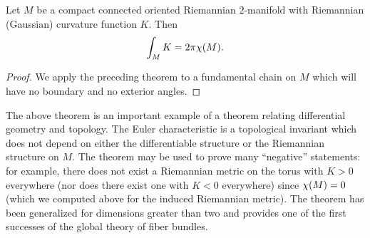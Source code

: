 \documentclass[../main]{subfiles}
\begin{document}
\begin{theorem} \label{thm:ch8.1.5}
Let $M$ be a compact connected oriented Riemannian $2$-manifold with Riemannian (Gaussian) curvature function $K.$ Then \[\int_{M}K=2\pi\chi(M).\]
\end{theorem}

\begin{proof}
We apply the preceding theorem to a fundamental chain on $M$ which will have no boundary and no exterior angles.
\end{proof}



The above theorem is an important example of a theorem relating differential geometry and topology. The Euler characteristic is a topological invariant which does not depend on either the differentiable structure or the Riemannian structure on $M.$ The theorem may be used to prove many ``negative'' statements: for example, there does not exist a Riemannian metric on the torus with $K>0$ everywhere (nor does there exist one with $K<0$ everywhere) since $\chi(M)=0$ (which we computed above for the induced Riemannian metric). The theorem has been generalized for dimensions greater than two and provides one of the first successes of the global theory of fiber bundles.
\end{document}
